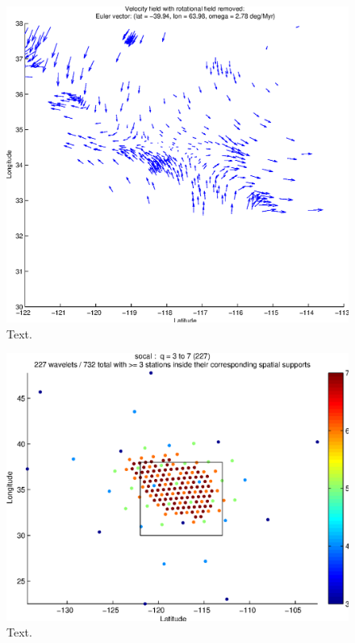 \documentclass[11pt,titlepage,fleqn]{article}
\begin{document}

\begin{figure}
\includegraphics[width=16cm]{fig2D_A5.eps}
\caption[]
{{
Text.
\label{fig:2D_A5}
}}
\end{figure}

\begin{figure}
\includegraphics[width=16cm]{fig2D_A6.eps}
\caption[]
{{
Text.
\label{fig:2D_A6}
}}
\end{figure}
\end{document}
